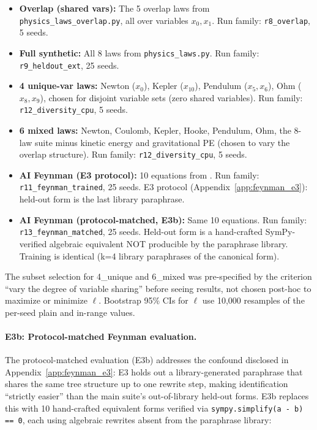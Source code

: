 \begin{itemize}[nosep]
\item \textbf{Overlap (shared vars):} The 5 overlap laws from \texttt{physics\_laws\_overlap.py}, all over variables $x_0, x_1$. Run family: \texttt{r8\_overlap}, 5 seeds.
\item \textbf{Full synthetic:} All 8 laws from \texttt{physics\_laws.py}. Run family: \texttt{r9\_heldout\_ext}, 25 seeds.
\item \textbf{4 unique-var laws:} Newton ($x_0$), Kepler ($x_{10}$), Pendulum ($x_5, x_6$), Ohm ($x_8, x_9$), chosen for disjoint variable sets (zero shared variables). Run family: \texttt{r12\_diversity\_cpu}, 5 seeds.
\item \textbf{6 mixed laws:} Newton, Coulomb, Kepler, Hooke, Pendulum, Ohm, the 8-law suite minus kinetic energy and gravitational PE (chosen to vary the overlap structure). Run family: \texttt{r12\_diversity\_cpu}, 5 seeds.
\item \textbf{AI Feynman (E3 protocol):} 10 equations from \citet{udrescu2020ai}. Run family: \texttt{r11\_feynman\_trained}, 25 seeds. E3 protocol (Appendix~\ref{app:feynman_e3}): held-out form is the last library paraphrase.
\item \textbf{AI Feynman (protocol-matched, E3b):} Same 10 equations. Run family: \texttt{r13\_feynman\_matched}, 25 seeds. Held-out form is a hand-crafted SymPy-verified algebraic equivalent NOT producible by the paraphrase library. Training is identical (k=4 library paraphrases of the canonical form).
\end{itemize}

The subset selection for 4\_unique and 6\_mixed was pre-specified by the criterion ``vary the degree of variable sharing'' before seeing results, not chosen post-hoc to maximize or minimize $\ell$. Bootstrap 95\% CIs for $\ell$ use 10,000 resamples of the per-seed plain and in-range values.

\paragraph{E3b: Protocol-matched Feynman evaluation.} The protocol-matched evaluation (E3b) addresses the confound disclosed in Appendix~\ref{app:feynman_e3}: E3 holds out a library-generated paraphrase that shares the same tree structure up to one rewrite step, making identification ``strictly easier'' than the main suite's out-of-library held-out forms. E3b replaces this with 10 hand-crafted equivalent forms verified via \texttt{sympy.simplify(a - b) == 0}, each using algebraic rewrites absent from the paraphrase library:

